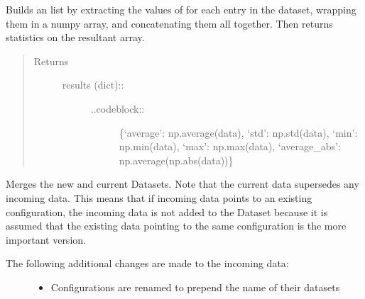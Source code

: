 \documentclass[letterpaper,10pt,english]{sphinxmanual}
\begin{document}
\begin{fulllineitems}
\begin{fulllineitems}
\label{\detokenize{dataset:colabfit.tools.dataset.Dataset.get_statistics}}
\sphinxAtStartPar
Builds an list by extracting the values of  for
each entry in the dataset, wrapping them in a numpy array, and
concatenating them all together. Then returns statistics on the
resultant array.
\begin{quote}\begin{description}
\item[{Returns}] \leavevmode
\sphinxAtStartPar
\begin{description}
\item[{results (dict)::}] \leavevmode\begin{description}
\item[{..code\sphinxhyphen{}block::}] \leavevmode
\sphinxAtStartPar
\{‘average’: np.average(data), ‘std’: np.std(data), ‘min’: np.min(data), ‘max’: np.max(data), ‘average\_abs’: np.average(np.abs(data))\}

\end{description}

\end{description}


\end{description}\end{quote}

\end{fulllineitems}


\begin{fulllineitems}
\label{\detokenize{dataset:colabfit.tools.dataset.Dataset.merge}}
\sphinxAtStartPar
Merges the new and current Datasets. Note that the current data
supersedes any incoming data. This means that if incoming data points
to an existing configuration, the incoming data is not added to the
Dataset because it is assumed that the existing data pointing to the
same configuration is the more important version.
\begin{description}
\item[{The following additional changes are made to the incoming data:}] \leavevmode\begin{itemize}
\item {} 
\sphinxAtStartPar
Configurations are renamed to prepend the name of their datasets


\end{itemize}
\end{description}
\end{fulllineitems}
\end{fulllineitems}
\end{document}
